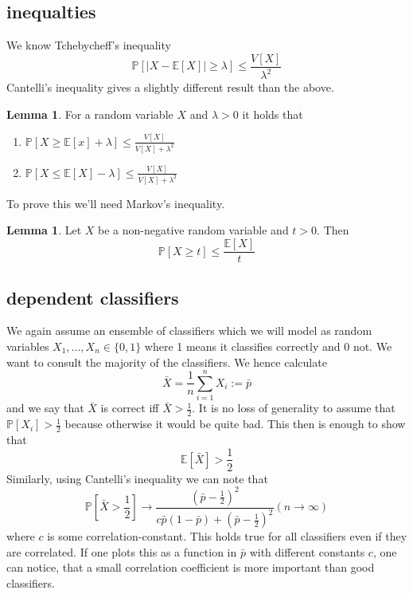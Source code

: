 \documentclass[a4paper, 12pt]{article}
\theoremstyle{plain}
\theoremstyle{definition}
\theoremstyle{lemma}
\newtheorem{lemma}[theorem]{Lemma}
\theoremstyle{remark}
\theoremstyle{example}
\begin{document}
	\subsection{inequalties}
	We know Tchebycheff's inequality \[\mathbb{P}[\left|X-\mathbb{E}[X]\right| \geq \lambda] \leq \frac{V[X]}{\lambda^2}\]
	Cantelli's inequality gives a slightly different result than the above. \begin{lemma}
		For a random variable $X$ and $\lambda >0$ it holds that \begin{enumerate}
			\item $\mathbb{P}[X\geq \mathbb{E}[x]+\lambda] \leq \frac{V[X]}{V[X]+\lambda^2}$
			\item $\mathbb{P}[X\leq \mathbb{E}[X]-\lambda] \leq \frac{V[X]}{V[X]+\lambda^2}$
		\end{enumerate} 
	\end{lemma}
	To prove this we'll need Markov's inequality. \begin{lemma}
		Let $X$ be a non-negative random variable and $t>0$. Then \[\mathbb{P}[X\geq t] \leq \frac{\mathbb{E}[X]}{t}\]
	\end{lemma}
	\subsection{dependent classifiers}
	We again assume an ensemble of classifiers which we will model as random variables $X_1,...,X_n \in \{0,1\}$ where 1 means it classifies correctly and 0 not. We want to consult the majority of the classifiers. We hence calculate \[\bar{X} = \frac{1}{n}\sum_{i=1}^n X_i := \bar{p}\] and we say that $\bar{X}$ is correct iff $\bar{X}>\frac{1}{2}$. It is no loss of generality to assume that $\mathbb{P}[X_i] > \frac{1}{2}$ because otherwise it would be quite bad. This then is enough to show that \[\mathbb{E}[\bar{X}] > \frac{1}{2}\] Similarly, using Cantelli's inequality we can note that \[\mathbb{P}[\bar{X}>\frac{1}{2}] \to \frac{(\bar{p}-\frac{1}{2})^2}{c\bar{p}(1-\bar{p}) + (\bar{p}-\frac{1}{2})^2} (n\to \infty)\] where $c$ is some correlation-constant. This holds true for all classifiers even if they are correlated. If one plots this as a function in $\bar{p}$ with different constants $c$, one can notice, that a small correlation coefficient is more important than good classifiers.
\end{document}
